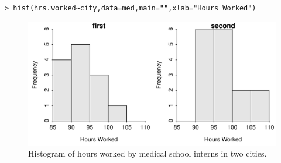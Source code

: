 \documentclass[10pt,openany]{book}\usepackage[]{graphicx}\usepackage[]{color}
\makeatletter
\newenvironment{kframe}{%
 \def\at@end@of@kframe{}%
 \ifinner\ifhmode%
  \def\at@end@of@kframe{\end{minipage}}%
  \begin{minipage}{\columnwidth}%
 \fi\fi%
 \def\FrameCommand##1{\hskip\@totalleftmargin \hskip-\fboxsep
 \colorbox{shadecolor}{##1}\hskip-\fboxsep
     \hskip-\linewidth \hskip-\@totalleftmargin \hskip\columnwidth}%
 \MakeFramed {\advance\hsize-\width
   \@totalleftmargin\z@ \linewidth\hsize
   \@setminipage}}%
 {\par\unskip\endMakeFramed%
 \at@end@of@kframe}
\newenvironment{knitrout}{}{} %
\makeatother
\begin{document}
\begin{itemize}
\begin{enumerate}
\begin{knitrout}
\color{fgcolor}\begin{kframe}
\begin{verbatim}
> hist(hrs.worked~city,data=med,main="",xlab="Hours Worked")
\end{verbatim}
\end{kframe}\begin{figure}[hbtp]

{\centering \includegraphics[width=.4\linewidth]{Figs/MedInternHrsHist-1} 

}

\caption[Histogram of hours worked by medical school interns in two cities]{Histogram of hours worked by medical school interns in two cities.}\label{fig:MedInternHrsHist}
\end{figure}


\end{knitrout}



\end{enumerate}
\end{itemize}
\end{document}
